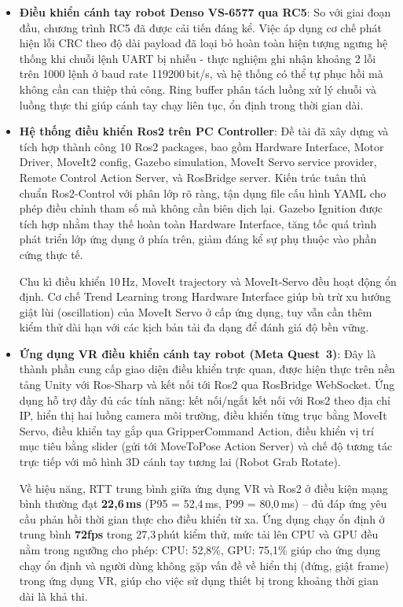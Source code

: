 \begin{itemize}
    \item \textbf{Điều khiển cánh tay robot Denso VS-6577 qua RC5}: So với giai đoạn đầu, chương trình RC5 đã được cải tiến đáng kể. Việc áp dụng cơ chế phát hiện lỗi CRC theo độ dài payload đã loại bỏ hoàn toàn hiện tượng ngưng hệ thống khi chuỗi lệnh UART bị nhiễu - thực nghiệm ghi nhận khoảng 2 lỗi trên 1000 lệnh ở baud rate 119200\,bit/s, và hệ thống có thể tự phục hồi mà không cần can thiệp thủ công. Ring buffer phân tách luồng xử lý chuỗi và luồng thực thi giúp cánh tay chạy liên tục, ổn định trong thời gian dài.

    \item \textbf{Hệ thống điều khiển Ros2 trên PC Controller}: Đề tài đã xây dựng và tích hợp thành công 10 Ros2 packages, bao gồm Hardware Interface, Motor Driver, MoveIt2 config, Gazebo simulation, MoveIt Servo service provider, Remote Control Action Server, và RosBridge server. Kiến trúc tuân thủ chuẩn Ros2-Control với phân lớp rõ ràng, tận dụng file cấu hình YAML cho phép điều chỉnh tham số mà không cần biên dịch lại. Gazebo Ignition được tích hợp nhằm thay thế hoàn toàn Hardware Interface, tăng tốc quá trình phát triển lớp ứng dụng ở phía trên, giảm đáng kể sự phụ thuộc vào phần cứng thực tế.

    Chu kì điều khiển 10\,Hz, MoveIt trajectory và MoveIt-Servo đều hoạt động ổn định. Cơ chế Trend Learning trong Hardware Interface giúp bù trừ xu hướng giật lùi (oscillation) của MoveIt Servo ở cấp ứng dụng, tuy vẫn cần thêm kiểm thử dài hạn với các kịch bản tải đa dạng để đánh giá độ bền vững.

    \item \textbf{Ứng dụng VR điều khiển cánh tay robot (Meta Quest~3)}: Đây là thành phần cung cấp giao diện điều khiển trực quan, được hiện thực trên nền tảng Unity với Ros-Sharp và kết nối tới Ros2 qua RosBridge WebSocket. Ứng dụng hỗ trợ đầy đủ các tính năng: kết nối/ngắt kết nối với Ros2 theo địa chỉ IP, hiển thị hai luồng camera môi trường, điều khiển từng trục bằng MoveIt Servo, điều khiển tay gắp qua GripperCommand Action, điều khiển vị trí mục tiêu bằng slider (gửi tới MoveToPose Action Server) và chế độ tương tác trực tiếp với mô hình 3D cánh tay tương lai (Robot Grab Rotate).

    Về hiệu năng, RTT trung bình giữa ứng dụng VR và Ros2 ở điều kiện mạng bình thường đạt \textbf{22{,}6\,ms} (P95 = 52{,}4\,ms, P99 = 80{,}0\,ms) -- đủ đáp ứng yêu cầu phản hồi thời gian thực cho điều khiển từ xa. Ứng dụng chạy ổn định ở trung bình \textbf{72fps} trong 27{,}3\,phút kiểm thử, mức tải lên CPU và GPU đều nằm trong ngưỡng cho phép: CPU: 52{,}8\%, GPU: 75{,}1\% giúp cho ứng dụng chạy ổn định và người dùng không gặp vấn đề về hiển thị (đứng, giật frame) trong ứng dụng VR, giúp cho việc sử dụng thiết bị trong khoảng thời gian dài là khả thi.
\end{itemize}

